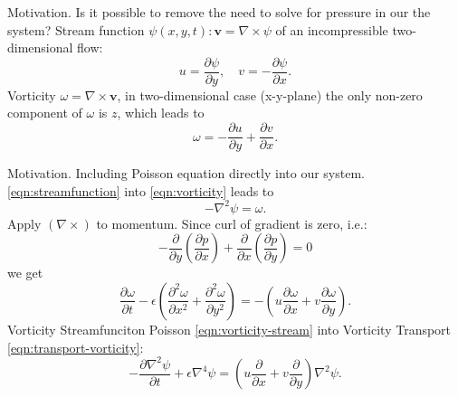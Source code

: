 \documentclass{beamer}
\begin{document}
	


	
	
	\begin{frame}{Motivation. Is it possible to remove the need to solve for pressure in our the system?}
	Stream function $\psi(x,y,t):\boldsymbol{v}=\nabla \times \psi$ of an incompressible two-dimensional flow:
	\begin{equation}
	\label{eqn:streamfunction}
		u = \frac{\partial \psi}{\partial y},\quad v=-\frac{\partial \psi}{\partial x}.
	\end{equation}
	Vorticity $\omega = \nabla \times \boldsymbol{v}$, in two-dimensional case (x-y-plane) the only non-zero component of $\omega$ is $z$, which leads to
	\begin{equation}
	\label{eqn:vorticity}
		\omega=- \frac{\partial u}{\partial y}+\frac{\partial v}{\partial x}.
	\end{equation}
	\end{frame}
  
  \begin{frame}{Motivation. Including Poisson equation directly into our system.}
  \eqref{eqn:streamfunction} into \eqref{eqn:vorticity} leads to
	\begin{equation}
			\label{eqn:vorticity-stream}
			-\nabla ^2 \psi = \omega.
		\end{equation}
  Apply $(\nabla \times)$ to momentum. Since curl of gradient is zero, i.e.:
	\begin{equation}
	-\frac{\partial}{\partial y}\left(\frac{\partial p}{\partial x}\right)  
	+\frac{\partial}{\partial x}\left(\frac{\partial p}{\partial y}\right)=0
	\end{equation}
	we get
  \begin{equation}
			\label{eqn:transport-vorticity}
				\frac{\partial\omega}{\partial t} -\epsilon \left(\frac{\partial ^2 \omega}{\partial x^2} 
				+ \frac{\partial^2 \omega}{\partial y^2} \right)
				=-\left( u \frac{\partial\omega}{\partial x} 
				+ v\frac{\partial\omega}{\partial y}\right).
			\end{equation}
	Vorticity Streamfunciton Poisson \eqref{eqn:vorticity-stream} into Vorticity Transport \eqref{eqn:transport-vorticity}:
	\begin{equation}
	\label{eqn:biharmonic-streamfunction}
		\boxed{
		-\frac{\partial\nabla ^2 \psi}{\partial t} 
		+\epsilon\nabla ^4 \psi=\left( u \frac{\partial}{\partial x} 
				+ v\frac{\partial}{\partial y}\right)\nabla^2\psi.
		}
	\end{equation}
	\end{frame}
	
\end{document}
